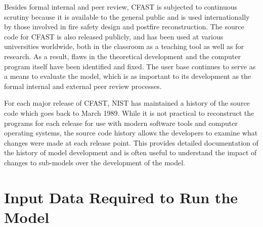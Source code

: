 Besides formal internal and peer review, CFAST is subjected to continuous scrutiny because it is available to the general public and is used internationally by those involved in fire safety design and postfire reconstruction. The source code for CFAST is also released publicly, and has been used at various universities worldwide, both in the classroom as a teaching tool as well as for research. As a result, flaws in the theoretical development and the computer program itself have been identified and fixed. The user base continues to serve as a means to evaluate the model, which is as important to its development as the formal internal and external peer review processes.

For each major release of CFAST, NIST has maintained a history of the source code which goes back to March 1989.  While it is not practical to reconstruct the programs for each release for use with modern software tools and computer operating systems, the source code history allows the developers to examine what changes were made at each release point. This provides detailed documentation of the history of model development and is often useful to understand the impact of changes to sub-models over the development of the model.




\section{Input Data Required to Run the Model}

